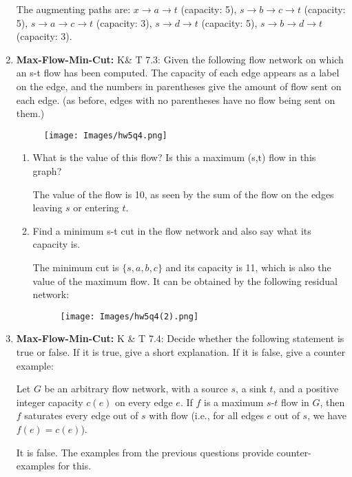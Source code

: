 \documentclass[letterpaper, 11pt]{article}
\begin{document}
\begin{enumerate}
    The augmenting paths are: $x \to a \to t$ (capacity: 5), $s \to b \to c \to t$ (capacity: 5), $s \to a \to c \to t$ (capacity: 3), $s \to d \to t$ (capacity: 5), $s \to b \to d \to t$ (capacity: 3).
    
    \item \textbf{Max-Flow-Min-Cut:} K\& T 7.3: Given the following flow network on which an s-t flow has been computed. The capacity of each edge appears as a label on the edge, and the numbers in parentheses give the amount of flow sent on each edge. (as before, edges with no parentheses have no flow being sent on them.)
    \begin{figure}[H]
        \centering
        \texttt{[image: Images/hw5q4.png]}
    \end{figure}
    \begin{enumerate}
        \item What is the value of this flow? Is this a maximum (s,t) flow in this graph?

        The value of the flow is 10, as seen by the sum of the flow on the edges leaving $s$ or entering $t$.
        
        \item Find a minimum s-t cut in the flow network and also say what its capacity is.

        The minimum cut is $\{s,a,b,c\}$ and its capacity is 11, which is also the value of the maximum flow. It can be obtained by the following residual network:
        \begin{figure}[H]
            \centering
            \texttt{[image: Images/hw5q4(2).png]}
        \end{figure}
        
    \end{enumerate}
    \item \textbf{Max-Flow-Min-Cut:} K \& T 7.4: Decide whether the following statement is true or false. If it is true, give a short explanation. If it is false, give a counter example:
    
    Let $G$ be an arbitrary flow network, with a source $s$, a sink $t$, and a positive integer capacity $c(e)$ on every edge $e$. If $f$ is a maximum $s$-$t$ flow in $G$, then $f$ saturates every edge out of $s$ with flow (i.e., for all edges $e$ out of $s$, we have $f(e) = c(e)$).

    It is false. The examples from the previous questions provide counter-examples for this.
\end{enumerate}
\end{document}
